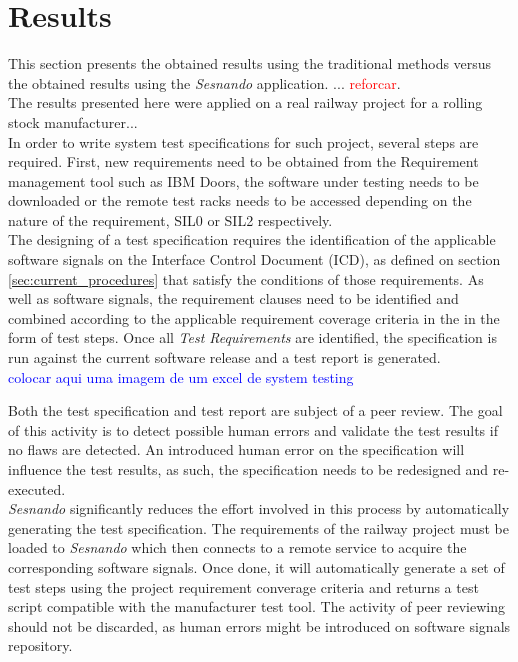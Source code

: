 \chapter{Results}
\label{ch:results}

This section presents the obtained results using the traditional methods versus the obtained results using the \textit{Sesnando} application. ... \textcolor{red}{reforcar}.\\

The results presented here were applied on a real railway project for a rolling stock manufacturer...\\

In order to write system test specifications for such project, several steps are required. First, new requirements need to be obtained from the Requirement management tool such as IBM Doors, the software under testing needs to be downloaded or the remote test racks needs to be accessed depending on the nature of the requirement, SIL0 or SIL2 respectively.\\

The designing of a test specification requires the identification of the applicable software signals on the Interface Control Document (ICD), as defined on section \ref{sec:current_procedures} that satisfy the conditions of those requirements. As well as software signals, the requirement clauses need to be identified and combined according to the applicable requirement coverage criteria in the in the form of test steps. Once all \textit{Test Requirements} are identified, the specification is run against the current software release and a test report is generated.\\

\textcolor{blue}{colocar aqui uma imagem de um excel de system testing}

Both the test specification and test report are subject of a peer review. The goal of this activity is to detect possible human errors and validate the test results if no flaws are detected. An introduced human error on the specification will influence the test results, as such, the specification needs to be redesigned and re-executed.\\

\textit{Sesnando} significantly reduces the effort involved in this process by automatically generating the test specification. The requirements of the railway project must be loaded to \textit{Sesnando} which then connects to a remote service to acquire the corresponding software signals. Once done, it will automatically generate a set of test steps using the project requirement converage criteria and returns a test script compatible with the manufacturer test tool. The activity of peer reviewing should not be discarded, as human errors might be introduced on software signals repository. \\

